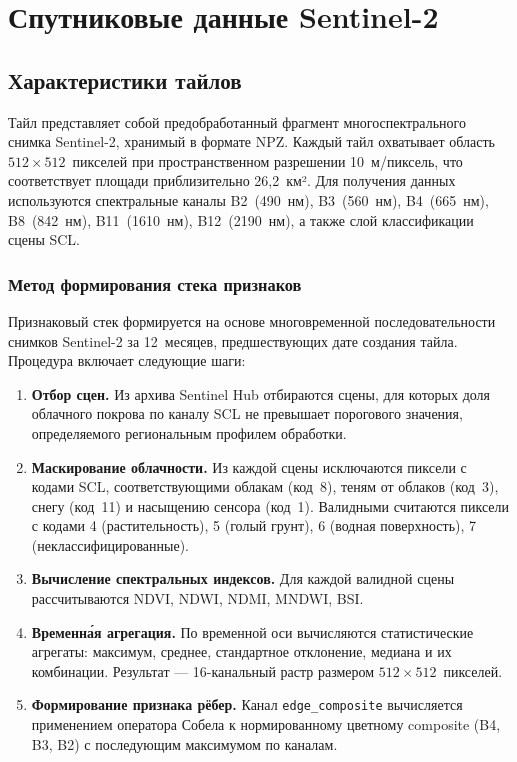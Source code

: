 \documentclass[14pt,a4paper]{extarticle}
\newcommand{\tbl}[1]{\texttt{#1}}  %
\begin{document}
\section{Спутниковые данные Sentinel-2}

\subsection{Характеристики тайлов}

Тайл представляет собой предобработанный фрагмент многоспектрального снимка
Sentinel-2, хранимый в формате NPZ. Каждый тайл охватывает область
$512 \times 512$~пикселей при пространственном разрешении 10~м/пиксель,
что соответствует площади приблизительно 26,2~км². Для получения данных
используются спектральные каналы B2~(490~нм), B3~(560~нм), B4~(665~нм),
B8~(842~нм), B11~(1610~нм), B12~(2190~нм), а также слой классификации
сцены SCL.

\subsubsection{Метод формирования стека признаков}

Признаковый стек формируется на основе многовременной последовательности
снимков Sentinel-2 за 12~месяцев, предшествующих дате создания тайла.
Процедура включает следующие шаги:

\begin{enumerate}
  \item \textbf{Отбор сцен.} Из архива Sentinel Hub отбираются сцены,
        для которых доля облачного покрова по каналу SCL не превышает порогового
        значения, определяемого региональным профилем обработки.

  \item \textbf{Маскирование облачности.} Из каждой сцены исключаются пиксели
        с кодами SCL, соответствующими облакам (код~8), теням от облаков (код~3),
        снегу (код~11) и насыщению сенсора (код~1). Валидными считаются пиксели
        с кодами 4 (растительность), 5 (голый грунт), 6 (водная поверхность),
        7 (неклассифицированные).

  \item \textbf{Вычисление спектральных индексов.} Для каждой валидной сцены
        рассчитываются NDVI, NDWI, NDMI, MNDWI, BSI.

  \item \textbf{Временн\'{а}я агрегация.} По временной оси вычисляются
        статистические агрегаты: максимум, среднее, стандартное отклонение,
        медиана и их комбинации. Результат — 16-канальный растр
        размером $512 \times 512$~пикселей.

  \item \textbf{Формирование признака рёбер.} Канал \tbl{edge\_composite}
        вычисляется применением оператора Собела к нормированному цветному
        composite (B4, B3, B2) с последующим максимумом по каналам.
\end{enumerate}
\end{document}
